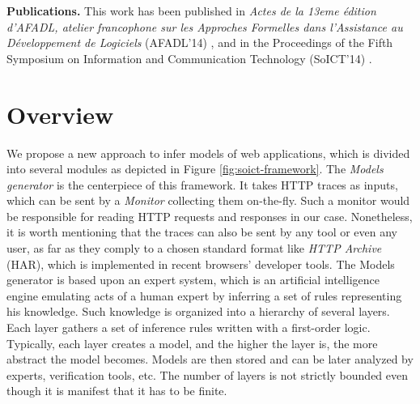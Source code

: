 \textbf{Publications.} This work has been published in
\emph{Actes de la 13eme {\'e}dition d’AFADL, atelier francophone
sur les Approches Formelles dans l’Assistance au
D{\'e}veloppement de Logiciels} (AFADL'14)
\cite{durand2014inference}, and in the Proceedings of the Fifth
Symposium on Information and Communication Technology (SoICT'14)
\cite{DBLP:conf/soict/DurandS14}.


\section{Overview}

We propose a new approach to infer models of web applications,
which is divided into several modules as depicted in Figure
\ref{fig:soict-framework}. The \textit{Models generator} is the
centerpiece of this framework. It takes HTTP traces as inputs,
which can be sent by a \textit{Monitor} collecting them on-the-fly.
Such a monitor would be responsible for reading HTTP requests and
responses in our case. Nonetheless, it is worth mentioning that the
traces can also be sent by any tool or even any user, as far as
they comply to a chosen standard format like \textit{HTTP
Archive} (HAR), which is implemented in recent browsers'
developer tools. The Models generator is based upon an expert
system, which is an artificial intelligence engine emulating acts
of a human expert by inferring a set of rules representing his
knowledge.  Such knowledge is organized into a hierarchy of
several layers.  Each layer gathers a set of inference rules
written with a first-order logic. Typically, each layer creates a
model, and the higher the layer is, the more abstract the model
becomes. Models are then stored and can be later analyzed by
experts, verification tools, etc. The number of layers is not
strictly bounded even though it is manifest that it has to be
finite.

